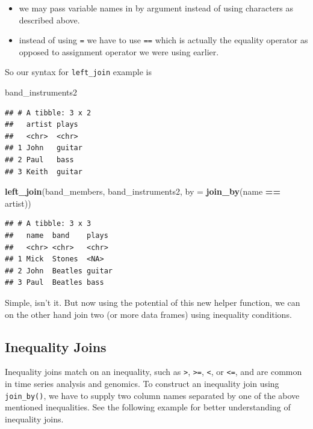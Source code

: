 \documentclass[
]{book}
\newenvironment{Shaded}{\begin{snugshade}}{\end{snugshade}}
\newcommand{\AttributeTok}[1]{\textcolor[rgb]{0.13,0.29,0.53}{#1}}
\newcommand{\FunctionTok}[1]{\textcolor[rgb]{0.13,0.29,0.53}{\textbf{#1}}}
\newcommand{\NormalTok}[1]{#1}
\newcommand{\SpecialCharTok}[1]{\textcolor[rgb]{0.81,0.36,0.00}{\textbf{#1}}}
\providecommand{\tightlist}{%
  \setlength{\itemsep}{0pt}\setlength{\parskip}{0pt}}
\begin{document}
\begin{itemize}
\tightlist
\item
  we may pass variable names in by argument instead of using characters as described above.
\item
  instead of using \texttt{=} we have to use \texttt{==} which is actually the equality operator as opposed to assignment operator we were using earlier.
\end{itemize}

So our syntax for \texttt{left\_join} example is

\begin{Shaded}
\begin{Highlighting}[]
\NormalTok{band\_instruments2}
\end{Highlighting}
\end{Shaded}

\begin{verbatim}
## # A tibble: 3 x 2
##   artist plays 
##   <chr>  <chr> 
## 1 John   guitar
## 2 Paul   bass  
## 3 Keith  guitar
\end{verbatim}

\begin{Shaded}
\begin{Highlighting}[]
\FunctionTok{left\_join}\NormalTok{(band\_members, band\_instruments2, }\AttributeTok{by =} \FunctionTok{join\_by}\NormalTok{(name }\SpecialCharTok{==}\NormalTok{ artist))}
\end{Highlighting}
\end{Shaded}

\begin{verbatim}
## # A tibble: 3 x 3
##   name  band    plays 
##   <chr> <chr>   <chr> 
## 1 Mick  Stones  <NA>  
## 2 John  Beatles guitar
## 3 Paul  Beatles bass
\end{verbatim}

Simple, isn't it. But now using the potential of this new helper function, we can on the other hand join two (or more data frames) using inequality conditions.

\hypertarget{inequality-joins}{%
\subsection{Inequality Joins}\label{inequality-joins}}

Inequality joins match on an inequality, such as \texttt{\textgreater{}}, \texttt{\textgreater{}=}, \texttt{\textless{}}, or \texttt{\textless{}=}, and are common in time series analysis and genomics. To construct an inequality join using \texttt{join\_by()}, we have to supply two column names separated by one of the above mentioned inequalities. See the following example for better understanding of inequality joins.
\end{document}
